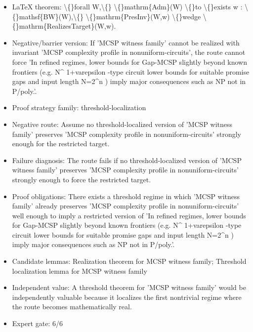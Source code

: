 \documentclass[11pt]{article}
\begin{document}
\begin{itemize}
\item LaTeX theorem: \textbackslash\{\}forall W,\textbackslash\{\} \textbackslash\{\}mathrm\{Adm\}(W) \textbackslash\{\}to \textbackslash\{\}exists w : \textbackslash\{\}mathsf\{BW\}(W),\textbackslash\{\} \textbackslash\{\}mathrm\{PresInv\}(W,w) \textbackslash\{\}wedge \textbackslash\{\}mathrm\{RealizesTarget\}(W,w).
\item Negative/barrier version: If 'MCSP witness family' cannot be realized with invariant 'MCSP complexity profile in nonuniform-circuits', the route cannot force 'In refined regimes, lower bounds for Gap-MCSP slightly beyond known frontiers (e.g. N\textasciicircum{} 1+varepsilon -type circuit lower bounds for suitable promise gaps and input length N=2\textasciicircum{}n ) imply major consequences such as NP not in P/poly.'.
\item Proof strategy family: threshold-localization
\item Negative route: Assume no threshold-localized version of 'MCSP witness family' preserves 'MCSP complexity profile in nonuniform-circuits' strongly enough for the restricted target.
\item Failure diagnosis: The route fails if no threshold-localized version of 'MCSP witness family' preserves 'MCSP complexity profile in nonuniform-circuits' strongly enough to force the restricted target.
\item Proof obligations: There exists a threshold regime in which 'MCSP witness family' already preserves 'MCSP complexity profile in nonuniform-circuits' well enough to imply a restricted version of 'In refined regimes, lower bounds for Gap-MCSP slightly beyond known frontiers (e.g. N\textasciicircum{} 1+varepsilon -type circuit lower bounds for suitable promise gaps and input length N=2\textasciicircum{}n ) imply major consequences such as NP not in P/poly.'.
\item Candidate lemmas: Realization theorem for MCSP witness family; Threshold localization lemma for MCSP witness family
\item Independent value: A threshold theorem for 'MCSP witness family' would be independently valuable because it localizes the first nontrivial regime where the route becomes mathematically real.
\item Expert gate: 6/6
\end{itemize}
\end{document}
